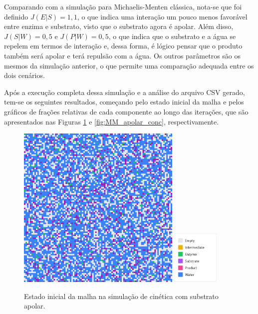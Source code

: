 \documentclass[12pt,oneside]{report}
\begin{document}
Comparando com a simulação para Michaelis-Menten clássica, nota-se que foi definido $J (E|S) = 1{,}1$, o que indica uma interação um pouco menos favorável entre enzima e substrato, visto que o substrato agora é apolar. Além disso, $J (S|W) = 0{,}5$ e $J (P|W) = 0{,}5$, o que indica que o substrato e a água se repelem em termos de interação e, dessa forma, é lógico pensar que o produto também será apolar e terá repulsão com a água. Os outros parâmetros são os mesmos da simulação anterior, o que permite uma comparação adequada entre os dois cenários.

Após a execução completa dessa simulação e a análise do arquivo CSV gerado, tem-se os seguintes resultados, começando pelo estado inicial da malha e pelos gráficos de frações relativas de cada componente ao longo das iterações, que são apresentados nas Figuras \ref{fig:MM_apolar_initial} e \ref{fig:MM_apolar_conc}, respectivamente.

\begin{figure}[H]
    \centering
    \includegraphics[width=0.7\textwidth]{img/MM_apolar_initial.png}
    \hspace{0.05\textwidth}
    \includegraphics[width=0.2\textwidth]{img/legend.png}
    \caption{\small Estado inicial da malha na simulação de cinética com substrato apolar.}
    \label{fig:MM_apolar_initial}
\end{figure}
\end{document}
